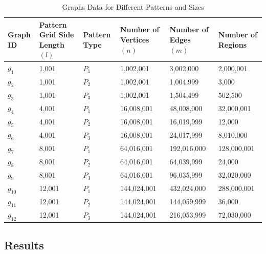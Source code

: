 \begin{table}
\centering
\begin{tabularx}{\textwidth}{|X|X|X|X|X|X|}
\hline
Graph ID & Pattern Grid Side Length \((l)\) & Pattern Type & Number of Vertices \((n)\) & Number of Edges \((m)\) & Number of Regions \\
\hline
\(g_1\) & 1,001 & \(P_1\) & 1,002,001 & 3,002,000 & 2,000,001 \\
\hline
\(g_2\) & 1,001 & \(P_2\) & 1,002,001 & 1,004,999 & 3,000 \\
\hline
\(g_3\) & 1,001 & \(P_3\) & 1,002,001 & 1,504,499 & 502,500 \\
\hline
\(g_4\) & 4,001 & \(P_1\) & 16,008,001 & 48,008,000 & 32,000,001 \\
\hline
\(g_5\) & 4,001 & \(P_2\) & 16,008,001 & 16,019,999 & 12,000 \\
\hline
\(g_6\) & 4,001 & \(P_3\) & 16,008,001 & 24,017,999 & 8,010,000 \\
\hline
\(g_7\) & 8,001 & \(P_1\) & 64,016,001 & 192,016,000 & 128,000,001 \\
\hline
\(g_8\) & 8,001 & \(P_2\) & 64,016,001 & 64,039,999 & 24,000 \\
\hline
\(g_9\) & 8,001 & \(P_3\) & 64,016,001 & 96,035,999 & 32,020,000 \\
\hline
\(g_{10}\) & 12,001 & \(P_1\) & 144,024,001 & 432,024,000 & 288,000,001 \\
\hline
\(g_{11}\) & 12,001 & \(P_2\) & 144,024,001 & 144,059,999 & 36,000 \\
\hline
\(g_{12}\) & 12,001 & \(P_3\) & 144,024,001 & 216,053,999 & 72,030,000 \\
\hline

\end{tabularx}
\caption{Graphs Data for Different Patterns and Sizes}
\label{tab:graph_data}
\end{table}

\subsection{Results}

